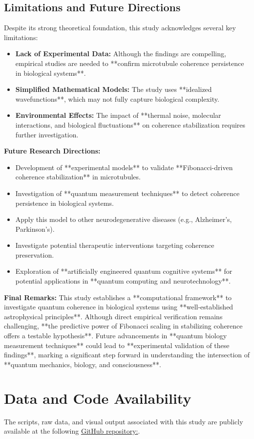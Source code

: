 \documentclass[entropy,article,submit,oneauthor,pdftex,]{Definitions/mdpi}
\begin{document}
\subsection{Limitations and Future Directions}
Despite its strong theoretical foundation, this study acknowledges several key limitations:
\begin{itemize}
    \item \textbf{Lack of Experimental Data:} Although the findings are compelling, empirical studies are needed to **confirm microtubule coherence persistence in biological systems**.
    \item \textbf{Simplified Mathematical Models:} The study uses **idealized wavefunctions**, which may not fully capture biological complexity.
    \item \textbf{Environmental Effects:} The impact of **thermal noise, molecular interactions, and biological fluctuations** on coherence stabilization requires further investigation.
\end{itemize}
\textbf{Future Research Directions:}
\begin{itemize}
    \item Development of **experimental models** to validate **Fibonacci-driven coherence stabilization** in microtubules.
    \item Investigation of **quantum measurement techniques** to detect coherence persistence in biological systems.
    \item Apply this model to other neurodegenerative diseases (e.g., Alzheimer’s, Parkinson’s).
    \item Investigate potential therapeutic interventions targeting coherence preservation.
    \item Exploration of **artificially engineered quantum cognitive systems** for potential applications in **quantum computing and neurotechnology**.
\end{itemize}
\textbf{Final Remarks:}  
This study establishes a **computational framework** to investigate quantum coherence in biological systems using **well-established astrophysical principles**. Although direct empirical verification remains challenging, **the predictive power of Fibonacci scaling in stabilizing coherence offers a testable hypothesis**. Future advancements in **quantum biology measurement techniques** could lead to **experimental validation of these findings**, marking a significant step forward in understanding the intersection of **quantum mechanics, biology, and consciousness**.
\section{Data and Code Availability}
The scripts, raw data, and visual output associated with this study are publicly available at
the following \href{https://github.com/TheonlyqueenAC/Microtubule\_Simulation}{GitHub repository:}.
\end{document}
